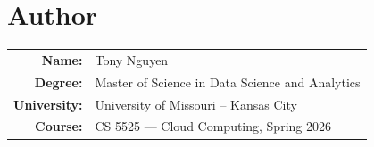 \documentclass[12pt,letterpaper]{article}
\begin{document}
\section{Author}

\begin{center}
\begin{tabular}{rl}
  \textbf{Name:}    & Tony Nguyen \\
  \textbf{Degree:}  & Master of Science in Data Science and Analytics \\
  \textbf{University:} & University of Missouri -- Kansas City \\
  \textbf{Course:}  & CS 5525 --- Cloud Computing, Spring 2026 \\
\end{tabular}
\end{center}
\end{document}
